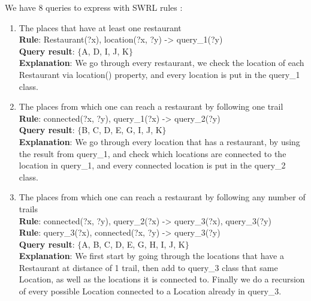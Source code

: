 \documentclass[14pt]
{article}
\begin{document}
We have 8 queries to express with SWRL rules :\\
\begin{enumerate}
\item The places that have at least one restaurant  \\
\textbf{Rule}: Restaurant(?x), location(?x, ?y) -> query\_1(?y)\\
\textbf{Query result}: $\{$A, D, I, J, K$\}$\\
\textbf{Explanation}: We go through every restaurant, we check the location of each Restaurant via location() property, and every location is put in the query\_1 class.\\
 
\item The places from which one can reach a restaurant by following one trail \\
\textbf{Rule}: connected(?x, ?y), query\_1(?x) -> query\_2(?y)\\
\textbf{Query result}: $\{$B, C, D, E, G, I, J, K$\}$\\
\textbf{Explanation}: We go through every location that has a restaurant, by using the result from query\_1, and check which locations are connected to the location in query\_1, and every connected location is put in the query\_2 class.\\

\item The places from which one can reach a restaurant by following any number of trails \\
\textbf{Rule}: connected(?x, ?y), query\_2(?x) -> query\_3(?x), query\_3(?y)\\
\textbf{Rule}: query\_3(?x), connected(?x, ?y) -> query\_3(?y)\\
\textbf{Query result}: $\{$A, B, C, D, E, G, H, I, J, K$\}$\\
\textbf{Explanation}: We first start by going through the locations that have a Restaurant at distance of 1 trail, then add to query\_3 class that same Location, as well as the locations it is connected to. Finally we do a recursion of every possible Location connected to a Location already in query\_3.\\


\end{enumerate}
\end{document}
